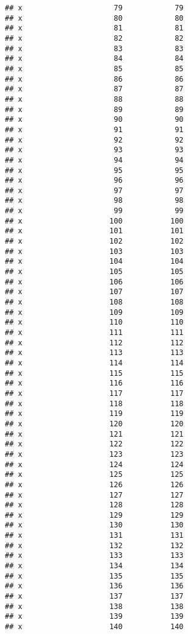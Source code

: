 \documentclass[
]{article}
\begin{document}
\begin{verbatim}
## x                     79            79
## x                     80            80
## x                     81            81
## x                     82            82
## x                     83            83
## x                     84            84
## x                     85            85
## x                     86            86
## x                     87            87
## x                     88            88
## x                     89            89
## x                     90            90
## x                     91            91
## x                     92            92
## x                     93            93
## x                     94            94
## x                     95            95
## x                     96            96
## x                     97            97
## x                     98            98
## x                     99            99
## x                    100           100
## x                    101           101
## x                    102           102
## x                    103           103
## x                    104           104
## x                    105           105
## x                    106           106
## x                    107           107
## x                    108           108
## x                    109           109
## x                    110           110
## x                    111           111
## x                    112           112
## x                    113           113
## x                    114           114
## x                    115           115
## x                    116           116
## x                    117           117
## x                    118           118
## x                    119           119
## x                    120           120
## x                    121           121
## x                    122           122
## x                    123           123
## x                    124           124
## x                    125           125
## x                    126           126
## x                    127           127
## x                    128           128
## x                    129           129
## x                    130           130
## x                    131           131
## x                    132           132
## x                    133           133
## x                    134           134
## x                    135           135
## x                    136           136
## x                    137           137
## x                    138           138
## x                    139           139
## x                    140           140

\end{verbatim}
\end{document}

